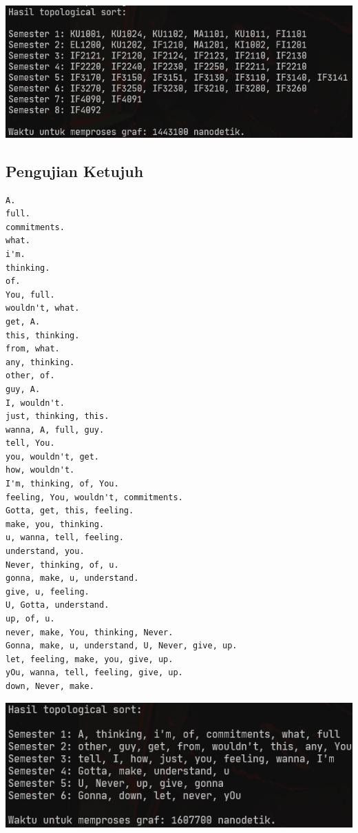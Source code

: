 \documentclass{article}
\let\origfigure\figure
\let\endorigfigure\endfigure
\renewenvironment{figure}[1][2] {
    \expandafter\origfigure\expandafter[H]
} {
    \endorigfigure
}
\begin{document}
\begin{figure}
  \includegraphics[scale=0.7]{6.png}
  \caption{\textit{input}}
\end{figure}
\subsection{Pengujian Ketujuh}
\begin{lstlisting}[caption = \textit{input}]
A.
full.
commitments.
what.
i'm.
thinking.
of.
You, full.
wouldn't, what.
get, A.
this, thinking.
from, what.
any, thinking.
other, of.
guy, A.
I, wouldn't.
just, thinking, this.
wanna, A, full, guy.
tell, You.
you, wouldn't, get.
how, wouldn't.
I'm, thinking, of, You.
feeling, You, wouldn't, commitments.
Gotta, get, this, feeling.
make, you, thinking.
u, wanna, tell, feeling.
understand, you.
Never, thinking, of, u.
gonna, make, u, understand.
give, u, feeling.
U, Gotta, understand.
up, of, u.
never, make, You, thinking, Never.
Gonna, make, u, understand, U, Never, give, up.
let, feeling, make, you, give, up.
yOu, wanna, tell, feeling, give, up.
down, Never, make.
\end{lstlisting}


\begin{figure}
  \includegraphics[scale=0.7]{7.png}
  \caption{\textit{input}}
\end{figure}
\end{document}
